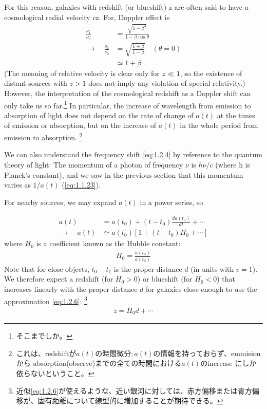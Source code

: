 \documentclass[11pt,a4paper,dvipdfmx]{jsarticle}
\theoremstyle{plain}
\theoremstyle{break}
\begin{document}
 For this reason, galaxies with redshift (or blueshift) z are often said to have a cosmological radial velocity cz.
 For, Doppler effect is
 \begin{align}
   \frac{\nu_1}{\nu_0}
   &= \frac{\sqrt{1-\beta^2}}{1-\beta \cos\theta}\\
   \rightarrow \quad
   \frac{\nu_1}{\nu_0}& = \sqrt{\frac{1+\beta}{1-\beta}} \quad (\theta = 0) \\
   &\simeq 1+\beta
 \end{align}
(The meaning of relative velocity is clear only for $z \ll 1$, so the existence of distant sources with $z > 1$ does not imply any violation of special relativity.)
However, the interpretation of the cosmological redshift as a Doppler shift can only take us so far.\footnote{そこまでしか。}
In particular, the increase of wavelength from emission to absorption of light does not depend on the rate of change of $a(t)$ at the times of emission or absorption, but on the increase of $a(t)$ in the whole period from emission to absorption.
\footnote{これは、redshiftが$a(t)$の時間微分:\,$\dot{a}(t)$の情報を持っておらず、emmision から absorption(observe)までの全ての時間における$a(t)$のincrease にしか依らないということ。}

We can also understand the frequency shift \eqref{eq:1.2.4} by reference to the quantum theory of light:
The momentum of a photon of frequency $\nu$ is $h\nu/c$ (where h is Planck's constant), and we saw in the previous section that this momentum varies as $1/a(t)$ (\eqref{eq:1.1.23}).

For nearby sources, we may expand $a(t)$ in a power series, so

\begin{align}
  a(t)
  &=  a(t_0)+ (t-t_0)\frac{da(t_0)}{dt} + \cdots \\
     \rightarrow \quad
  a(t)
  &\simeq   a(t_0) [1+ (t - t_0) H_0 + \cdots ] \label{eq:1.2.6}
\end{align}
where $H_0$ is a coefficient known as the Hubble constant:
\begin{align}
  H_0 = \frac{\dot{a}(t_0)}{a(t_0)}
\end{align}
Note that for close objects, $t_0 -t_1$ is the proper distance $d$ (in units with $c=1$). We therefore expect a redshift (for $H_0>0$) or blueshift (for $H_0<0$) that increases linearly with the proper distance $d$ for galaxies close enough to use the approximation \eqref{eq:1.2.6}:
\footnote{近似\eqref{eq:1.2.6}が使えるような、近い銀河に対しては、赤方偏移または青方偏移が、固有距離について線型的に増加することが期待できる。}
\begin{align}
  z = H_0 d + \cdots \label{eq:1.2.9}
\end{align}
\end{document}
